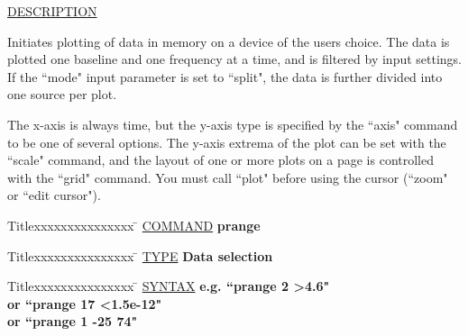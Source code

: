 \underline{DESCRIPTION}
\begin{list}{}{\setlength{\leftmargin}{0.5in}
     \setlength{\rightmargin}{0in}}
\item
Initiates plotting of data in memory on a device of the
users choice.  The data is plotted one baseline and one
frequency at a time, and is filtered by input settings.
If the ``mode" input parameter is set to ``split", the data
is further divided into one source per plot.
\item
The x-axis is always time, but the y-axis type is specified
by the ``axis" command to be one of several options.  The
y-axis extrema of the plot can be set with the ``scale"
command, and the layout of one or more plots on a page is
controlled with the ``grid" command.  You must call ``plot"
before using the cursor (``zoom" or ``edit cursor").
\end{list}
\vspace{.2in}

\begin{tabbing}
Titlexxxxxxxxxxxxxxx \= \kill
\underline{COMMAND} \> {\bf 	prange} \\
\end{tabbing}

\begin{tabbing}
Titlexxxxxxxxxxxxxxx \= \kill
\underline{TYPE} \> {\bf 		Data selection} \\
\end{tabbing}

\begin{tabbing}
Titlexxxxxxxxxxxxxxx \= \kill
\underline{SYNTAX} \> {\bf 		e.g. ``prange 2 >4.6"} \\
\> {\bf 		or ``prange 17 <1.5e-12"} \\
\> {\bf 		or ``prange 1 -25 74"} \\
\end{tabbing}

